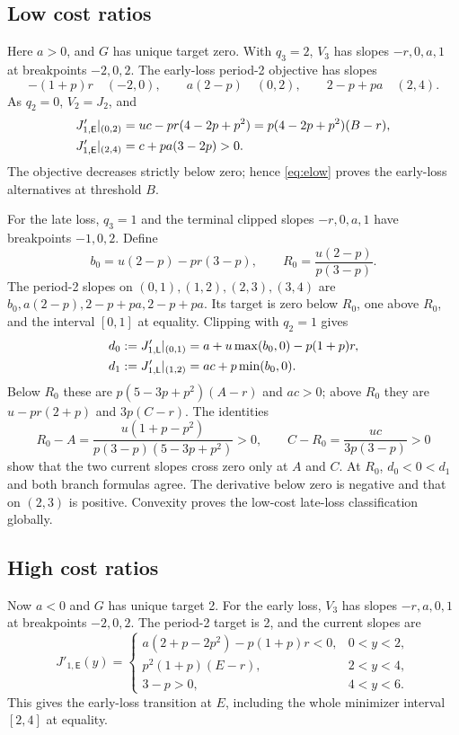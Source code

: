 \documentclass[11pt]{article}
\theoremstyle{remark}\newtheorem{remark}[theorem]{Remark}
\newcommand{\Ecase}{\mathsf E}
\newcommand{\Lcase}{\mathsf L}
\begin{document}
\subsection{Low cost ratios}\label{sec:low}
Here $a>0$, and $G$ has unique target zero. With $q_3=2$, $V_3$ has
slopes $-r,0,a,1$ at breakpoints $-2,0,2$. The early-loss period-2
objective has slopes
\[
 -(1+p)r\quad(-2,0),\qquad a(2-p)\quad(0,2),\qquad
 2-p+pa\quad(2,4).
\]
As $q_2=0$, $V_2=J_2$, and
\begin{align}\label{eq:elow}
 J'_{1,\Ecase}|_{(0,2)}&=uc-pr(4-2p+p^2)
                      =p(4-2p+p^2)(B-r),\notag\\
 J'_{1,\Ecase}|_{(2,4)}&=c+pa(3-2p)>0.
\end{align}
The objective decreases strictly below zero; hence \eqref{eq:elow}
proves the early-loss alternatives at threshold $B$.

For the late loss, $q_3=1$ and the terminal clipped slopes $-r,0,a,1$
have breakpoints $-1,0,2$. Define
\[
 b_0=u(2-p)-pr(3-p),\qquad R_0=\frac{u(2-p)}{p(3-p)}.
\]
The period-2 slopes on $(0,1),(1,2),(2,3),(3,4)$ are
$b_0,a(2-p),2-p+pa,2-p+pa$. Its target is zero below $R_0$, one
above $R_0$, and the interval $[0,1]$ at equality. Clipping with $q_2=1$
gives
\begin{align}\label{eq:dlow}
 d_0:=J'_{1,\Lcase}|_{(0,1)}&=a+u\max(b_0,0)-p(1+p)r,\notag\\
 d_1:=J'_{1,\Lcase}|_{(1,2)}&=ac+p\min(b_0,0).
\end{align}
Below $R_0$ these are $p(5-3p+p^2)(A-r)$ and $ac>0$;
above $R_0$ they are $u-pr(2+p)$ and $3p(C-r)$.
The identities
\[
 R_0-A=\frac{u(1+p-p^2)}{p(3-p)(5-3p+p^2)}>0,\qquad
 C-R_0=\frac{uc}{3p(3-p)}>0
\]
show that the two current slopes cross zero only at $A$ and $C$.
At $R_0$, $d_0<0<d_1$ and both branch formulas agree.
The derivative below zero is negative and that on $(2,3)$ is positive.
Convexity proves the low-cost late-loss classification globally.

\subsection{High cost ratios}\label{sec:high}
Now $a<0$ and $G$ has unique target 2. For the early loss, $V_3$ has
slopes $-r,a,0,1$ at breakpoints $-2,0,2$. The period-2 target is 2,
and the current slopes are
\begin{equation}\label{eq:ehigh}
 J'_{1,\Ecase}(y)=\begin{cases}
 a(2+p-2p^2)-p(1+p)r<0,&0<y<2,\\
 p^2(1+p)(E-r),&2<y<4,\\
 3-p>0,&4<y<6.
 \end{cases}
\end{equation}
This gives the early-loss transition at $E$, including the whole
minimizer interval $[2,4]$ at equality.
\end{document}
